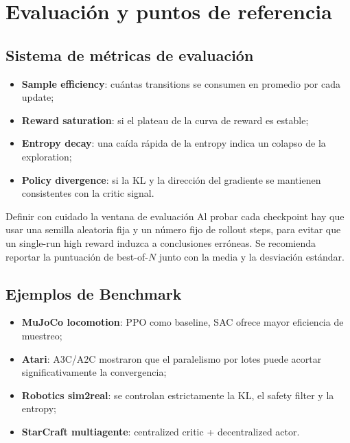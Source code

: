 \section{Evaluación y puntos de referencia}

\subsection{Sistema de métricas de evaluación}

\begin{itemize}
    \item \textbf{Sample efficiency}: cuántas transitions se consumen en promedio por cada update;
    \item \textbf{Reward saturation}: si el plateau de la curva de reward es estable;
    \item \textbf{Entropy decay}: una caída rápida de la entropy indica un colapso de la exploration;
    \item \textbf{Policy divergence}: si la KL y la dirección del gradiente se mantienen consistentes con la critic signal.
\end{itemize}

\begin{importantbox}{Definir con cuidado la ventana de evaluación}
Al probar cada checkpoint hay que usar una semilla aleatoria fija y un número fijo de rollout steps, para evitar que un single-run high reward induzca a conclusiones erróneas. Se recomienda reportar la puntuación de best-of-$N$ junto con la media y la desviación estándar.
\end{importantbox}

\subsection{Ejemplos de Benchmark}

\begin{itemize}
    \item \textbf{MuJoCo locomotion}: PPO como baseline, SAC ofrece mayor eficiencia de muestreo;
    \item \textbf{Atari}: A3C/A2C mostraron que el paralelismo por lotes puede acortar significativamente la convergencia;
    \item \textbf{Robotics sim2real}: se controlan estrictamente la KL, el safety filter y la entropy;
    \item \textbf{StarCraft multiagente}: centralized critic + decentralized actor.
\end{itemize}

